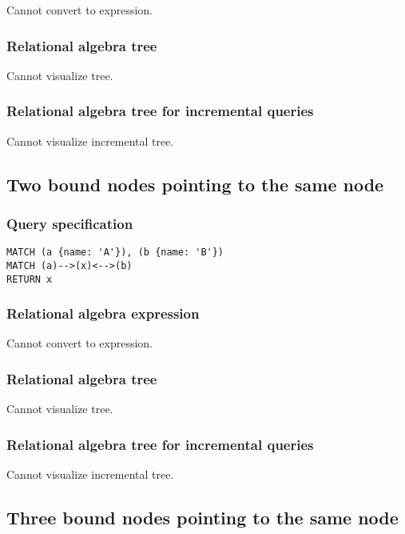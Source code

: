 Cannot convert to expression.

\subsubsection*{Relational algebra tree}

Cannot visualize tree.

\subsubsection*{Relational algebra tree for incremental queries}

Cannot visualize incremental tree.

\subsection{Two bound nodes pointing to the same node}

\subsubsection*{Query specification}

\begin{lstlisting}
MATCH (a {name: 'A'}), (b {name: 'B'})
MATCH (a)-->(x)<-->(b)
RETURN x
\end{lstlisting}

\subsubsection*{Relational algebra expression}

Cannot convert to expression.

\subsubsection*{Relational algebra tree}

Cannot visualize tree.

\subsubsection*{Relational algebra tree for incremental queries}

Cannot visualize incremental tree.

\subsection{Three bound nodes pointing to the same node}

